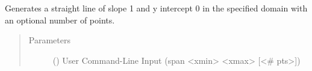 \documentclass[letterpaper,10pt,english]{sphinxmanual}
\begin{document}
\begin{fulllineitems}
\begin{fulllineitems}
\label{\detokenize{pydv:pdv.Command.do_sinx}}
\end{fulllineitems}


\begin{fulllineitems}
\label{\detokenize{pydv:pdv.Command.do_smooth}}
\end{fulllineitems}


\begin{fulllineitems}
\label{\detokenize{pydv:pdv.Command.do_sort}}
\end{fulllineitems}


\begin{fulllineitems}
\label{\detokenize{pydv:pdv.Command.do_span}}
Generates a straight line of slope 1 and y intercept 0 in the specified domain with an optional number of points.
\begin{quote}\begin{description}
\item[{Parameters}] \leavevmode
{} () \textendash{} User Command-Line Input (span \textless{}xmin\textgreater{} \textless{}xmax\textgreater{} {[}\textless{}\# pts\textgreater{}{]})

\end{description}\end{quote}

\end{fulllineitems}


\begin{fulllineitems}
\label{\detokenize{pydv:pdv.Command.do_sqr}}
\end{fulllineitems}


\end{fulllineitems}
\end{document}
